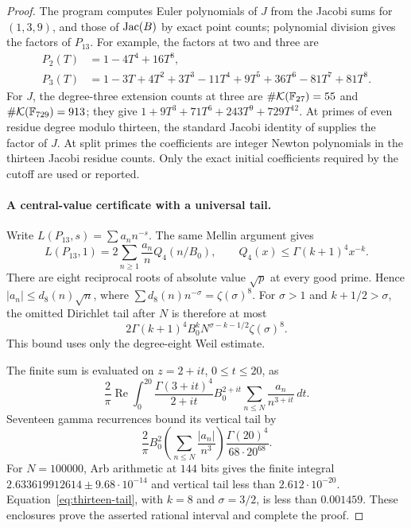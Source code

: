 \begin{proof}
The program computes Euler polynomials of $J$ from the Jacobi sums
for $(1,3,9)$, and those of $\operatorname{Jac}(B)$ by exact point counts;
polynomial division gives the factors of $P_{13}$.
For example, the factors at two and three are
\[
 \begin{split}
 P_2(T)&=1-4T^4+16T^8,\\
 P_3(T)&=1-3T+4T^2+3T^3-11T^4+9T^5
                       +36T^6-81T^7+81T^8.
 \end{split}
\]
For $J$, the degree-three extension counts at three are
$\#\mathcal K(\mathbb F_{27})=55$ and
$\#\mathcal K(\mathbb F_{729})=913$; they give
$1+9T^3+71T^6+243T^9+729T^{12}$.
At primes of even residue degree modulo thirteen, the standard
Jacobi identity of \citet[Lemma~1.1]{GrossRohrlich1978} supplies
the factor of $J$. At split primes the coefficients are integer
Newton polynomials in the thirteen Jacobi residue counts.
Only the exact initial coefficients required by the cutoff are
used or reported.

\paragraph{A central-value certificate with a universal tail.}
Write $L(P_{13},s)=\sum a_nn^{-s}$. The same Mellin argument gives
\[
 L(P_{13},1)=2\sum_{n\ge1}\frac{a_n}{n}Q_4(n/B_0),\qquad
 Q_4(x)\le\Gamma(k+1)^4x^{-k}.
\]
There are eight reciprocal roots of absolute value $\sqrt p$ at
every good prime. Hence $|a_n|\le d_8(n)\sqrt n$, where
$\sum d_8(n)n^{-\sigma}=\zeta(\sigma)^8$.
For $\sigma>1$ and $k+1/2>\sigma$, the omitted Dirichlet tail
after $N$ is therefore at most
\begin{equation}\label{eq:thirteen-tail}
 2\Gamma(k+1)^4B_0^kN^{\sigma-k-1/2}\zeta(\sigma)^8.
\end{equation}
This bound uses only the degree-eight Weil estimate.

The finite sum is evaluated on $z=2+it$, $0\le t\le20$, as
\[
 \frac2\pi\operatorname{Re}\int_0^{20}
 \frac{\Gamma(3+it)^4}{2+it}B_0^{2+it}
 \sum_{n\le N}\frac{a_n}{n^{3+it}}\,dt.
\]
Seventeen gamma recurrences bound its vertical tail by
\[
 \frac2\pi B_0^2\left(\sum_{n\le N}\frac{|a_n|}{n^3}\right)
 \frac{\Gamma(20)^4}{68\cdot20^{68}}.
\]
For $N=100000$, Arb arithmetic at $144$ bits gives the finite
integral $2.633619912614\pm9.68\cdot10^{-14}$ and vertical tail
less than $2.612\cdot10^{-20}$.
Equation~\eqref{eq:thirteen-tail}, with $k=8$ and $\sigma=3/2$,
is less than $0.001459$. These enclosures prove the asserted
rational interval and complete the proof.
\end{proof}

